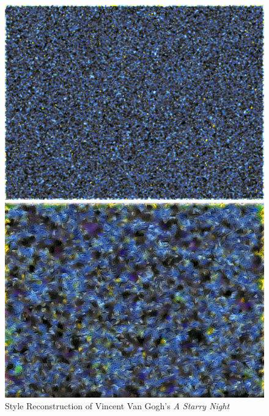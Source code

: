 \documentclass{article}
\begin{document}
\begin{figure}[htp]
\centering
\caption{Style Reconstruction of Vincent Van Gogh's \textit{A Starry Night}}
\label{fig:style-reconstruction}

    \begin{minipage}{0.3\linewidth}
    \includegraphics[width=\textwidth]{img/style/block1_conv1}
    \end{minipage}
    \begin{minipage}{0.3\linewidth}
    \includegraphics[width=\textwidth]{img/style/block2_conv1}
    \end{minipage}
    \begin{minipage}{0.3\linewidth}

\end{minipage}
\end{figure}
\end{document}
